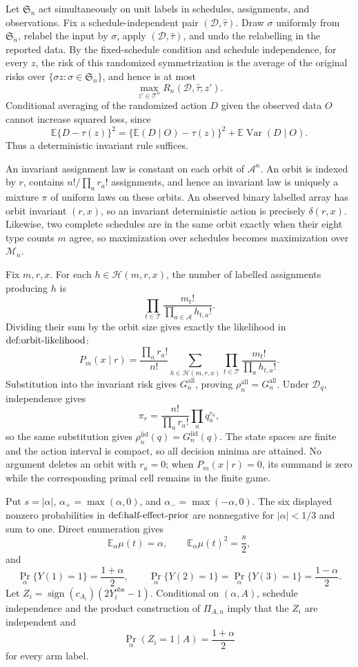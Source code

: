 Let \(\mathfrak S_n\) act simultaneously on unit labels in schedules, assignments, and observations.  Fix a schedule-independent pair \((\mathcal D,\widehat\tau)\).  Draw \(\sigma\) uniformly from \(\mathfrak S_n\), relabel the input by \(\sigma\), apply \((\mathcal D,\widehat\tau)\), and undo the relabelling in the reported data.  By the fixed-schedule condition and schedule independence, for every \(z\), the risk of this randomized symmetrization is the average of the original risks over \(\{\sigma z:\sigma\in\mathfrak S_n\}\), and hence is at most
\[
\max_{z'\in\mathcal T^n}R_n(\mathcal D,\widehat\tau;z').
\]
Conditional averaging of the randomized action \(D\) given the observed data \(O\) cannot increase squared loss, since
\[
\mathbb E\{D-\tau(z)\}^2
=\{\mathbb E(D\mid O)-\tau(z)\}^2+\mathbb E\operatorname{Var}(D\mid O).
\]
Thus a deterministic invariant rule suffices.

An invariant assignment law is constant on each orbit of \(\mathcal A^n\).  An orbit is indexed by \(r\), contains \(n!/\prod_a r_a!\) assignments, and hence an invariant law is uniquely a mixture \(\pi\) of uniform laws on these orbits.  An observed binary labelled array has orbit invariant \((r,x)\), so an invariant deterministic action is precisely \(\delta(r,x)\).  Likewise, two complete schedules are in the same orbit exactly when their eight type counts \(m\) agree, so maximization over schedules becomes maximization over \(\mathcal M_n\).

Fix \(m,r,x\).  For each \(h\in\mathcal H(m,r,x)\), the number of labelled assignments producing \(h\) is
\[
\prod_{t\in\mathcal T}\frac{m_t!}{\prod_{a\in\mathcal A}h_{t,a}!}.
\]
Dividing their sum by the orbit size gives exactly the likelihood in \(\textnormal{def:orbit-likelihood}\):
\[
P_m(x\mid r)=\frac{\prod_a r_a!}{n!}
\sum_{h\in\mathcal H(m,r,x)}
\prod_{t\in\mathcal T}\frac{m_t!}{\prod_a h_{t,a}!}.
\]
Substitution into the invariant risk gives \(G_n^{\mathrm{all}}\), proving \(\rho_n^{\mathrm{all}}=G_n^{\mathrm{all}}\).  Under \(\mathcal D_q\), independence gives
\[
\pi_r=\frac{n!}{\prod_a r_a!}\prod_aq_a^{r_a},
\]
so the same substitution gives \(\rho_n^{\mathrm{iid}}(q)=G_n^{\mathrm{iid}}(q)\).  The state spaces are finite and the action interval is compact, so all decision minima are attained.  No argument deletes an orbit with \(r_a=0\); when \(P_m(x\mid r)=0\), its summand is zero while the corresponding primal cell remains in the finite game.

Put \(s=|\alpha|\), \(\alpha_+=\max(\alpha,0)\), and \(\alpha_-=\max(-\alpha,0)\).  The six displayed nonzero probabilities in \(\textnormal{def:half-effect-prior}\) are nonnegative for \(|\alpha|<1/3\) and sum to one.  Direct enumeration gives
\[
\mathbb E_\alpha\mu(t)=\alpha,
\qquad
\mathbb E_\alpha\mu(t)^2=\frac{s}{2},
\]
and
\[
\Pr_\alpha\{Y(1)=1\}=\frac{1+\alpha}{2},
\qquad
\Pr_\alpha\{Y(2)=1\}=\Pr_\alpha\{Y(3)=1\}=\frac{1-\alpha}{2}.
\]
Let \(Z_i=\operatorname{sign}(c_{A_i})(2Y_i^{\mathrm{obs}}-1)\).  Conditional on \((\alpha,A)\), schedule independence and the product construction of \(\Pi_{A,n}\) imply that the \(Z_i\) are independent and
\[
\Pr_\alpha(Z_i=1\mid A)=\frac{1+\alpha}{2}
\]
for every arm label.

